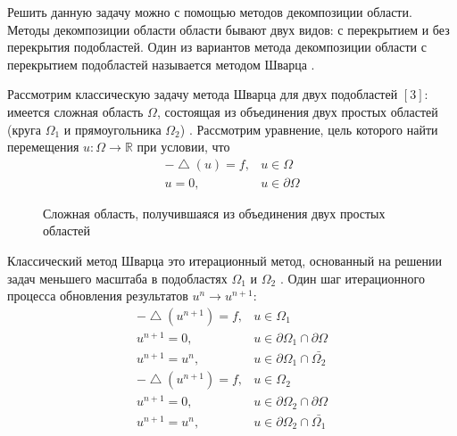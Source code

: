 \documentclass[a4paper, 14pt]{extarticle}
\begin{document}
Решить данную задачу можно с помощью методов декомпозиции области. Методы декомпозиции области области бывают двух видов: с перекрытием и без перекрытия подобластей. Один из вариантов метода декомпозиции области с перекрытием подобластей называется методом Шварца \cite{1}.

Рассмотрим классическую задачу метода Шварца для двух подобластей $\left[3\right]$: имеется сложная область $\Omega$, состоящая из объединения двух простых областей (круга $\Omega_1$ и прямоугольника $\Omega_2$) \cite{2}. Рассмотрим уравнение, цель которого найти перемещения $u: \Omega \rightarrow \mathbb{R}$ при условии, что
\begin{equation*}
\begin{array}{rl}
-\bigtriangleup \!(u) = f, & u \in \Omega \\
u = 0, & u \in \partial \Omega
\end{array}
\end{equation*}

\begin{figure}[h]
\caption{Сложная область, получившаяся из объединения двух простых областей}
\label{fig:image_01}
\end{figure}

Классический метод Шварца это итерационный метод, основанный на решении задач меньшего масштаба в подобластях $\Omega_1$ и $\Omega_2$ \cite{3}. Один шаг итерационного процесса обновления результатов $u^n \rightarrow u^{n+1}$:
\begin{eqnarray*}
-\bigtriangleup \! (u^{n+1}) = f, & u \in \Omega_1 \\
u^{n+1} = 0, & u \in \partial \Omega_1 \cap \partial \Omega \\
u^{n+1} = u^n, & u \in \partial \Omega_1 \cap \bar{\Omega_2}
\end{eqnarray*}
\begin{eqnarray*}
-\bigtriangleup \! (u^{n+1}) = f, & u \in \Omega_2 \\
u^{n+1} = 0, & u \in \partial \Omega_2 \cap \partial \Omega \\
u^{n+1} = u^n, & u \in \partial \Omega_2 \cap \bar{\Omega_1}
\end{eqnarray*}
\end{document}
